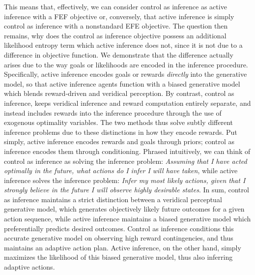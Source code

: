 This means that, effectively, we can consider control as inference as active inference with a FEF objective or, conversely, that active inference is simply control as inference with a nonstandard EFE objective. The question then remains, why does the control as inference objective possess an additional likelihood entropy term which active inference does not, since it is not due to a difference in objective function. We demonstrate that the difference actually arises due to the way goals or likelihoods are encoded in the inference procedure. Specifically, active inference encodes goals or rewards \emph{directly} into the generative model, so that active inference agents function with a biased generative model which blends reward-driven and veridical perception. By contrast, control as inference, keeps veridical inference and reward computation entirely separate, and instead includes rewards into the inference procedure through the use of exogenous optimality variables. The two methods thus solve subtly different inference problems due to these distinctions in how they encode rewards. Put simply, active inference encodes rewards and goals through priors; control as inference encodes them through conditioning.  Phrased intuitively, we can think of control as inference as solving the inference problem: \emph{Assuming that I have acted optimally in the future, what actions do I infer I will have taken}, while active inference solves the inference problem: \emph{Infer my most likely actions, given that I strongly believe in the future I will observe highly desirable states}. In sum, control as inference maintains a strict distinction between a veridical perceptual generative model, which generates objectively likely future outcomes for a given action sequence, while active inference maintains a biased generative model which preferentially predicts desired outcomes. Control as inference conditions this accurate generative model on observing high reward contingencies, and thus maintains an adaptive action plan. Active inference, on the other hand, simply maximizes the likelihood of this biased generative model, thus also inferring adaptive actions.

